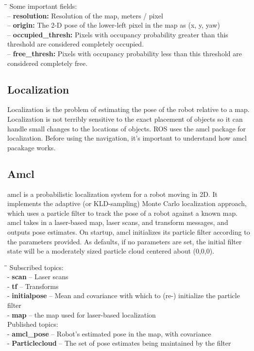 \documentclass[10pt,a4paper]{article}
\begin{document}
\begin{tabbing}
\hspace{1cm}\=\hspace{1cm}\=\kill
Some important fields:\\
\>  – \textbf{resolution:} Resolution of the map, meters / pixel \\
\>  – \textbf{origin:} The 2-D pose of the lower-left pixel in the map as (x, y, yaw) \\
\>  – \textbf{occupied\_thresh:} Pixels with occupancy probability greater than this threshold are considered completely occupied. \\
\> – \textbf{free\_thresh:} Pixels with occupancy probability less than this threshold are considered completely free. \\
\end{tabbing}

\subsection{Localization}

Localization is the problem of estimating the pose of the robot relative to a map. Localization is not terribly sensitive to the exact placement of objects so it can handle small changes to the locations of objects. ROS uses the amcl package for localization. Before using the navigation, it’s important to understand how amcl pacakage works. 

\subsection{Amcl}
amcl is a probabilistic localization system for a robot moving in 2D. It implements the adaptive (or KLD-sampling) Monte Carlo localization approach, which uses a particle filter to track the pose of a robot against a known map. amcl takes in a laser-based map, laser scans, and transform messages, and outputs pose estimates. On startup, amcl initializes its particle filter according to the parameters provided. As defaults, if no parameters are set, the initial filter state will be a moderately sized particle cloud centered about (0,0,0).

\begin{tabbing}
\hspace{1cm}\=\hspace{1cm}\=\kill
Subscribed topics:\\
\> - \textbf{scan} – Laser scans\\
\> - \textbf{tf} – Transforms\\
\> - \textbf{initialpose} – Mean and covariance with which to (re-) initialize the particle filter \\
\> - \textbf{map} – the map used for laser-based localization \\

Published topics:\\
\> - \textbf{amcl\_pose} – Robot's estimated pose in the map, with covariance\\
\> - \textbf{Particlecloud} – The set of pose estimates being maintained by the filter\\
\end{tabbing}
\end{document}
